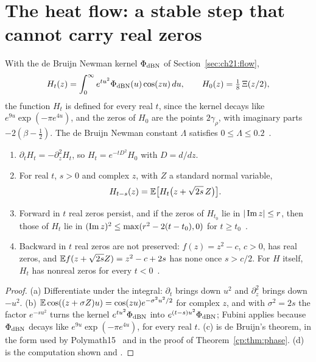 \section{The heat flow: a stable step that cannot carry real zeros}\label{tf:sec:heat}

With the de Bruijn Newman kernel $\Phi_{\rm dBN}$ of Section~\ref{sec:ch21:flow},
\[
H_t(z)=\int_0^\infty e^{tu^2}\Phi_{\rm dBN}(u)\cos(zu)\,du,\qquad H_0(z)=\tfrac18\,\Xi(z/2),
\]
the function $H_t$ is defined for every real $t$, since the kernel decays like $e^{9u}\exp(-\pi e^{4u})$, and the zeros of $H_0$ are the points $2\gamma_\rho$, with imaginary parts $-2(\beta-\tfrac12)$. The de Bruijn Newman constant $\Lambda$ satisfies $0\le\Lambda\le0.2$~\cite{RodgersTao,PT21}.

\begin{theorem}\label{tf:thm:heat}
\begin{enumerate}
\item[(a)] $\partial_tH_t=-\partial_z^2H_t$, so $H_t=e^{-tD^2}H_0$ with $D=d/dz$.
\item[(b)] For real $t$, $s>0$ and complex $z$, with $Z$ a standard normal variable,
\[
H_{t-s}(z)=\mathbb{E}\big[H_t\big(z+\sqrt{2s}\,Z\big)\big].
\]
\item[(c)] Forward in $t$ real zeros persist, and if the zeros of $H_{t_0}$ lie in $|\operatorname{Im} z|\le r$, then those of $H_t$ lie in $(\operatorname{Im} z)^2\le\max(r^2-2(t-t_0),0)$ for $t\ge t_0$~\cite[Theorem~13]{deBruijn}.
\item[(d)] Backward in $t$ real zeros are not preserved: $f(z)=z^2-c$, $c>0$, has real zeros, and $\mathbb{E} f(z+\sqrt{2s}Z)=z^2-c+2s$ has none once $s>c/2$. For $H$ itself, $H_t$ has nonreal zeros for every $t<0$~\cite{RodgersTao}.
\end{enumerate}
\end{theorem}

\begin{proof}
(a) Differentiate under the integral: $\partial_t$ brings down $u^2$ and $\partial_z^2$ brings down $-u^2$. (b) $\mathbb{E}\cos((z+\sigma Z)u)=\cos(zu)e^{-\sigma^2u^2/2}$ for complex $z$, and with $\sigma^2=2s$ the factor $e^{-su^2}$ turns the kernel $e^{tu^2}\Phi_{\rm dBN}$ into $e^{(t-s)u^2}\Phi_{\rm dBN}$; Fubini applies because $\Phi_{\rm dBN}$ decays like $e^{9u}\exp(-\pi e^{4u})$, for every real $t$. (c) is de Bruijn's theorem, in the form used by Polymath15~\cite{Polymath} and in the proof of Theorem~\ref{cp:thm:phase}. (d) is the computation shown and \cite{RodgersTao}.
\end{proof}

